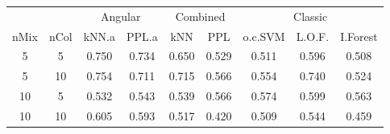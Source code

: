 
\begin{tabular}{ccccccccc}
\toprule
\multicolumn{2}{c}{ } & \multicolumn{2}{c}{Angular} & \multicolumn{2}{c}{Combined} & \multicolumn{3}{c}{Classic} \\
\cmidrule(l{3pt}r{3pt}){3-4} \cmidrule(l{3pt}r{3pt}){5-6} \cmidrule(l{3pt}r{3pt}){7-9}
nMix & nCol & kNN.a & PPL.a & kNN & PPL & o.c.SVM & L.O.F. & I.Forest\\
\midrule
5 & 5 & 0.750 & 0.734 & 0.650 & 0.529 & 0.511 & 0.596 & 0.508\\
5 & 10 & 0.754 & 0.711 & 0.715 & 0.566 & 0.554 & 0.740 & 0.524\\
10 & 5 & 0.532 & 0.543 & 0.539 & 0.566 & 0.574 & 0.599 & 0.563\\
10 & 10 & 0.605 & 0.593 & 0.517 & 0.420 & 0.509 & 0.544 & 0.459\\
\bottomrule
\end{tabular}